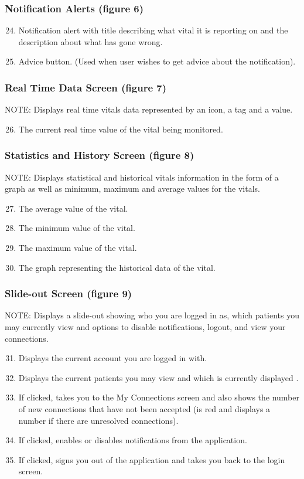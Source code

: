 \documentclass{article}
\begin{document}
\subsubsection{Notification Alerts (figure 6)}
\begin{enumerate}
\setcounter{enumi}{23}
	\item Notification alert with title describing what vital it is reporting on and the description about what has gone wrong. 
	\item Advice button. (Used when user wishes to get advice about the notification).   
\end{enumerate}
\subsubsection{Real Time Data Screen (figure 7)}
NOTE:  Displays real time vitals data represented by an icon, a tag and a value.
\begin{enumerate}
\setcounter{enumi}{25}
	\item The current real time value of the vital being monitored. 
\end{enumerate}

\subsubsection{Statistics and History Screen (figure 8)}
NOTE: Displays statistical and historical vitals information in the form of a graph as well as minimum, maximum and average values for the vitals.
\begin{enumerate}
\setcounter{enumi}{26}
	\item The average value of the vital. 
	\item The minimum value of the vital. 
	\item The maximum value of the vital. 
	\item The graph representing the historical data of the vital. 
\end{enumerate}

\subsubsection{Slide-out Screen (figure 9)}
NOTE: Displays a slide-out showing who you are logged in as, which patients you may currently view and options to disable notifications, logout, and view your connections. 
\begin{enumerate}
\setcounter{enumi}{30}
	\item Displays the current account you are logged in with. 
	\item Displays the current patients you may view and which is currently displayed . 
	\item If clicked, takes you to the My Connections screen and also shows the number of new connections that have not been accepted (is red and displays a number if there are unresolved connections). 
	\item If clicked, enables or disables notifications from the application. 
    \item If clicked, signs you out of the application and takes you back to the login screen. 
\end{enumerate}
\end{document}
